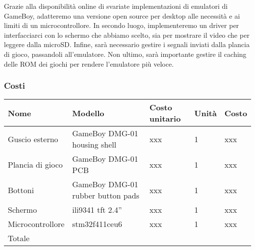 \documentclass[12pt]{article}
\begin{document}
Grazie alla disponibilità online di svariate implementazioni di
emulatori di GameBoy, adatteremo una versione open source per desktop
alle necessità e ai limiti di un microcontrollore. In secondo luogo,
implementeremo un driver per interfacciarci con lo schermo che abbiamo
scelto, sia per mostrare il video che per leggere dalla microSD. Infine,
sarà necessario gestire i segnali inviati dalla plancia di gioco,
passandoli all'emulatore. Non ultimo, sarà importante gestire il caching
delle ROM dei giochi per rendere l'emulatore più veloce.

\subsubsection{Costi}


\begin{table}[h]
\begin{tabular}{|llll|l|}
\hline
\multicolumn{1}{|l|}{Nome}             & \multicolumn{1}{l|}{Modello}                           & \multicolumn{1}{l|}{Costo unitario} & Unità & Costo \\ \hline
\multicolumn{1}{|l|}{Guscio esterno}   & \multicolumn{1}{l|}{GameBoy DMG-01 housing shell}      & \multicolumn{1}{l|}{xxx}            & 1     & xxx   \\ \hline
\multicolumn{1}{|l|}{Plancia di gioco} & \multicolumn{1}{l|}{GameBoy DMG-01 PCB}                & \multicolumn{1}{l|}{xxx}            & 1     & xxx   \\ \hline
\multicolumn{1}{|l|}{Bottoni}          & \multicolumn{1}{l|}{GameBoy DMG-01 rubber button pads} & \multicolumn{1}{l|}{xxx}            & 1     & xxx   \\ \hline
\multicolumn{1}{|l|}{Schermo}          & \multicolumn{1}{l|}{ili9341 tft 2.4''}                 & \multicolumn{1}{l|}{xxx}            & 1     & xxx   \\ \hline
\multicolumn{1}{|l|}{Microcontrollore} & \multicolumn{1}{l|}{stm32f411ceu6}                     & \multicolumn{1}{l|}{xxx}            & 1     & xxx   \\ \hline
\multicolumn{4}{|l|}{Totale}                                                                                                                  &       \\ \hline
\end{tabular}
\end{table}
\end{document}
